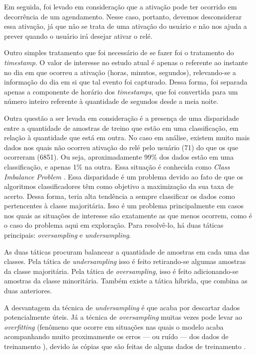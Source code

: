 			Em seguida, foi levado em consideração que a ativação pode ter ocorrido em decorrência de um agendamento. Nesse caso, portanto, devemos desconsiderar essa ativação, já que não se trata de uma ativação do usuário e não nos ajuda a prever quando o usuário irá desejar ativar o relé.

			Outro simples tratamento que foi necessário de se fazer foi o tratamento do \emph{timestamp}. O valor de interesse no estudo atual é apenas o referente ao instante no dia em que ocorreu a ativação (horas, minutos, segundos), relevando-se a informação do dia em si que tal evento foi capturado. Dessa forma, foi separada apenas a componente de horário dos \emph{timestamps}, que foi convertida para um número inteiro referente à quantidade de segundos desde a meia noite.

			Outra questão a ser levada em consideração é a presença de uma disparidade entre a quantidade de amostras de treino que estão em uma classificação, em relação à quantidade que está em outra. No caso em análise, existem muito mais dados nos quais não ocorreu ativação do relé pelo usuário (71) do que os que ocorreram (6851). Ou seja, aproximadamente 99\% dos dados estão em uma classificação, e apenas 1\% na outra. Essa situação é conhecida como \emph{Class Imbalance Problem} \cite{classImbalanceProblem}. Essa disparidade é um problema devido ao fato de que os algoritmos classificadores têm como objetivo a maximização da sua taxa de acerto. Dessa forma, teria alta tendência a sempre classificar os dados como pertencentes à classe majoritária. Isso é um problema principalmente em casos nos quais as situações de interesse são exatamente as que menos ocorrem, como é o caso do problema aqui em exploração. Para resolvê-lo, há duas táticas principais: \emph{oversampling} e \emph{undersampling}.

			As duas táticas procuram balancear a quantidade de amostras em cada uma das classes. Pela tática de \emph{undersampling} isso é feito retirando-se algumas amostras da classe majoritária. Pela tática de \emph{oversampling}, isso é feito adicionando-se amostras da classe minoritária. Também existe a tática híbrida, que combina as duas anteriores.

			A desvantagem da técnica de \emph{undersampling} é que acaba por descartar dados potencialmente úteis. Já a técnica de \emph{oversampling} muitas vezes pode levar ao \emph{overfitting} (fenômeno que ocorre em situações nas quais o modelo acaba acompanhando muito proximamente os erros --- ou ruído --- dos dados de treinamento \cite{islr}), devido às cópias que são feitas de alguns dados de treinamento \cite{unbalancedClassArticle}.

